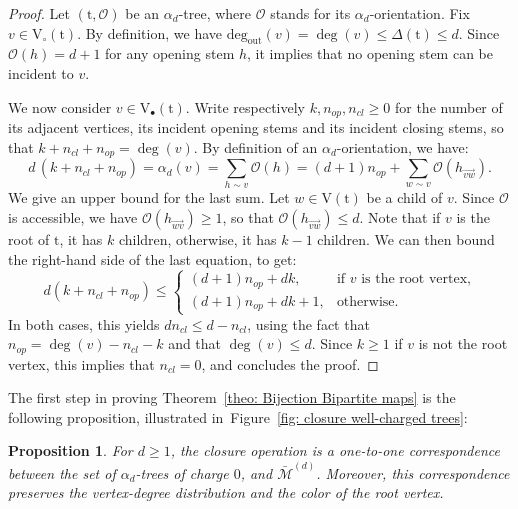 \documentclass[11pt,reqno,tbtags]{amsart}
\newcommand{\rV}{\mathrm{V}}
\newcommand{\rt}{\mathrm{t}}
\newtheorem{prop}[theo]{Proposition}
\numberwithin{equation}{section}
\numberwithin{theo}{section}
\theoremstyle{definition}
\newcommand{\cO}{\mathcal{O}}
\newcommand{\out}{\mathrm{deg_{out}}}
\begin{document}
\begin{proof}
Let $(\rt,\cO)$ be an $\alpha_d$-tree, where $\cO$ stands for its $\alpha_d$-orientation. Fix $v\in \rV_\circ(\rt)$. By definition, we have  $\out(v)=\deg(v)\leq \Delta(\rt) \leq d$. Since $\cO(h)=d+1$ for any opening stem $h$, it implies that no opening stem can be incident to $v$. 

We now consider $v\in \rV_\bullet(\rt)$. Write respectively $k, n_{op}, n_{cl}\geq 0$ for the number of its adjacent vertices, its incident opening stems and its incident closing stems, so that $k+n_{cl}+n_{op}=\deg(v)$. By definition of an $\alpha_d$-orientation, we have: 
\begin{equation*}
d\, \left(k+n_{cl}+n_{op}\right) = \alpha_d(v) =\sum_{h\sim v}{\cO(h)} = \left(d+1\right)n_{op} + \sum_{w\sim v}{\cO(h_{\overrightarrow{vw}})}.
\end{equation*}
We give an upper bound for the last sum. Let ${w\in\rV(\rt)}$ be a child of $v$. Since $\cO$ is accessible, we have $\cO(h_{\overrightarrow{wv}})\geq 1$, so that $\cO(h_{\overrightarrow{vw}})\leq d$. Note that if $v$ is the root of $\rt$, it has $k$ children, otherwise, it has $k-1$ children. We can then bound the right-hand side of the last equation, to get: 
\begin{equation*}
d\left(k+n_{cl}+n_{op}\right) \leq \begin{cases}
\left(d+1\right)n_{op} + dk,& \text{if }v\text{ is the root vertex,}\\
\left(d+1\right)n_{op} + dk +1, &\text{otherwise.}
\end{cases}
\end{equation*}
In both cases, this yields $d n_{cl} \leq d-n_{cl}$, using the fact that ${n_{op}= \deg(v)-n_{cl}-k}$ and that $\deg(v)\leq d$. Since $k\geq 1$ if $v$ is not the root vertex, this implies that $n_{cl}=0$, and concludes the proof.
\end{proof}

The first step in proving Theorem~\ref{theo: Bijection Bipartite maps} is the following proposition, illustrated in~Figure~\ref{fig: closure well-charged trees}:

\begin{prop}\label{prop:Bij_Bipartite_Alpha}
For $d\geq 1$, the closure operation is a one-to-one correspondence between the set of $\alpha_d$-trees of charge $0$, and $\bar{\mathcal{M}}^{(d)}$.
Moreover, this correspondence preserves the vertex-degree distribution and the color of the root vertex.
\end{prop}
\end{document}
